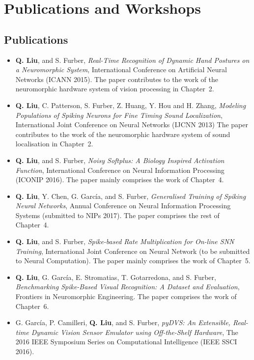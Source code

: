    
\section{Publications and Workshops}
\subsection{Publications}

\begin{itemize}
	Much of the work discussed in this thesis has either previously been presented or been in the process of submission.
	\item 
	\textbf{Q. Liu}, and S. Furber, \textit{Real-Time Recognition of Dynamic Hand Postures on a Neuromorphic System}, International Conference on Artificial Neural Networks (ICANN 2015).
	The paper contributes to the work of the neuromorphic hardware system of vision processing in Chapter~2.
	
	\item
	\textbf{Q. Liu}, C. Patterson, S. Furber, Z. Huang, Y. Hou and H. Zhang, \textit{Modeling Populations of Spiking Neurons for Fine Timing Sound Localization}, International Joint Conference on Neural Networks (IJCNN 2013)
	The paper contributes to the work of the neuromorphic hardware system of sound localisation in Chapter~2.
	
	\item 
	\textbf{Q. Liu}, and S. Furber, \textit{Noisy Softplus: A Biology Inspired Activation Function}, International Conference on Neural Information Processing (ICONIP 2016). 
	The paper mainly comprises the work of Chapter~4.
	
	\item 
	\textbf{Q. Liu}, Y. Chen, G. Garc\'ia, and S. Furber, \textit{Generalised Training of Spiking Neural Networks}, Annual Conference on Neural Information Processing Systems (submitted to NIPs 2017). 
	The paper comprises the rest of Chapter~4.
	
	
	\item 
	\textbf{Q. Liu}, and S. Furber, \textit{Spike-based Rate Multiplication for On-line SNN Training}, International Joint Conference on Neural Network (to be submitted to Neural Computation).
	The paper mainly comprises the work of Chapter~5.
	
	\item 
	\textbf{Q. Liu}, G. Garc\'ia, E. Stromatias, T. Gotarredona, and S. Furber, \textit{Benchmarking Spike-Based Visual Recognition: A Dataset and Evaluation}, Frontiers in Neuromorphic Engineering.
	The paper comprises the work of Chapter~6.
	

	\item 
	G. Garc\'ia, P. Camilleri, \textbf{Q. Liu}, and S. Furber, \textit{pyDVS: An Extensible, Real-time Dynamic Vision Sensor Emulator using Off-the-Shelf Hardware}, The 2016 IEEE Symposium Series on Computational Intelligence (IEEE SSCI 2016).
	
	
\end{itemize}	


